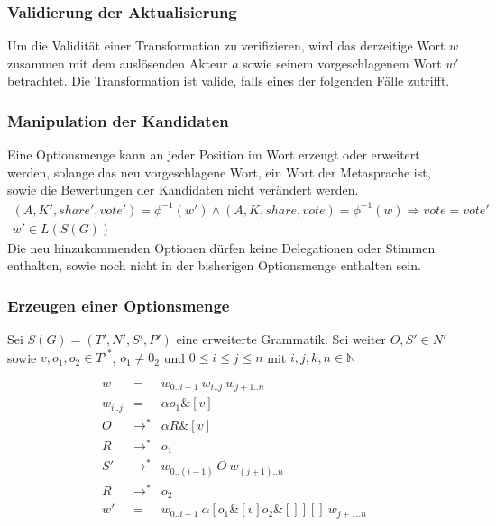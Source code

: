 \documentclass[a4paper,12pt]{article}
\begin{document}
\subsubsection*{Validierung der Aktualisierung}
Um die Validität einer Transformation zu verifizieren, wird das derzeitige Wort $w$ zusammen mit dem auslösenden Akteur $a$ sowie seinem vorgeschlagenem Wort $w'$ betrachtet. Die Transformation ist valide, falls eines der folgenden Fälle zutrifft.

% 
% 
% 
% 




\subsubsection*{Manipulation der Kandidaten}
Eine Optionsmenge kann an jeder Position im Wort erzeugt oder erweitert werden, solange das neu vorgeschlagene Wort, ein Wort der Metasprache ist, sowie die Bewertungen der Kandidaten nicht verändert werden.
\begin{eqnarray}
(A,K',share',vote') = \phi^{-1}(w') \land (A,K,share,vote) = \phi^{-1}(w) \Rightarrow vote = vote' \\
  w'\in L(S(G))
\end{eqnarray}
Die neu hinzukommenden Optionen dürfen keine Delegationen oder Stimmen enthalten, sowie noch nicht in der bisherigen Optionsmenge enthalten sein.

\subsubsection*{Erzeugen einer Optionsmenge}

Sei $S(G) = (T', N', S', P')$ eine erweiterte Grammatik. Sei weiter $O,S'\in N'$ sowie $v,o_1,o_2 \in T'^*$, $o_1\neq 0_2$ und $0\leq i\leq j\leq n$ mit $i,j,k,n \in \mathbb{N}$

\begin{eqnarray}
  w &=& w_{0 .. i-1}\ w_{i..j}\ w_{j+1 .. n} \\
  w_{i..j} &=& \alpha o_1 \& [v] \\
  O &\rightarrow^*& \alpha R \& [v] \\
  R &\rightarrow^*& o_1 \\
  S' &\rightarrow^*& w_{0 .. (i-1)}\ O\ w_{(j+1) .. n}\\
  R &\rightarrow^*& o_2 \\
  w' &=& w_{0..i-1}\ \alpha [o_1\& [v] o_2\& []][]\ w_{j+1 .. n}
\end{eqnarray}
\end{document}
